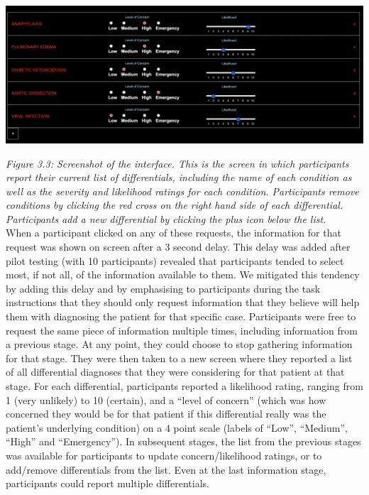 \documentclass[a4paper, nobind]{templates/ociamthesis}
\begin{document}
\begin{center}\includegraphics[width=1\linewidth]{./assets/Screenshot2} \end{center}

\emph{Figure 3.3: Screenshot of the interface. This is the screen in which participants report their current list of differentials, including the name of each condition as well as the severity and likelihood ratings for each condition. Participants remove conditions by clicking the red cross on the right hand side of each differential. Participants add a new differential by clicking the plus icon below the list.}\\

When a participant clicked on any of these requests, the information for that request was shown on screen after a 3 second delay. This delay was added after pilot testing (with 10 participants) revealed that participants tended to select most, if not all, of the information available to them. We mitigated this tendency by adding this delay and by emphasising to participants during the task instructions that they should only request information that they believe will help them with diagnosing the patient for that specific case. Participants were free to request the same piece of information multiple times, including information from a previous stage. At any point, they could choose to stop gathering information for that stage. They were then taken to a new screen where they reported a list of all differential diagnoses that they were considering for that patient at that stage. For each differential, participants reported a likelihood rating, ranging from 1 (very unlikely) to 10 (certain), and a ``level of concern'' (which was how concerned they would be for that patient if this differential really was the patient's underlying condition) on a 4 point scale (labels of ``Low'', ``Medium'', ``High'' and ``Emergency''). In subsequent stages, the list from the previous stages was available for participants to update concern/likelihood ratings, or to add/remove differentials from the list. Even at the last information stage, participants could report multiple differentials.\\
\end{document}
